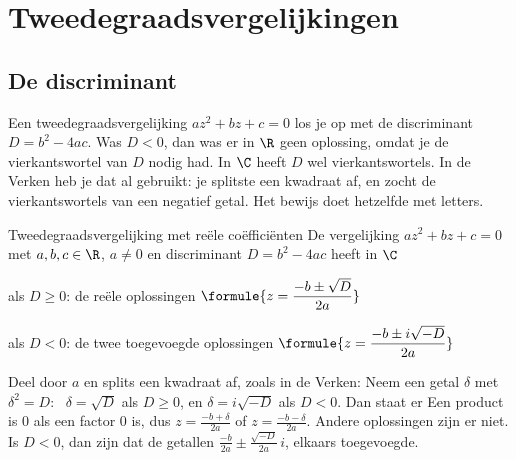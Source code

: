 \section{Tweedegraadsvergelijkingen}

\subsection{De discriminant}

Een tweedegraadsvergelijking $az^2 + bz + c = 0$ los je op met de discriminant $D = b^2 - 4ac$. Was $D < 0$, dan was er in $\R$ geen oplossing, omdat je de vierkantswortel van $D$ nodig had. In $\C$ heeft $D$ wel vierkantswortels. In de Verken heb je dat al gebruikt: je splitste een kwadraat af, en zocht de vierkantswortels van een negatief getal. Het bewijs doet hetzelfde met letters.

\begin{theorie}
\begin{stelling}{Tweedegraadsvergelijking met reële coëfficiënten}
De vergelijking $az^2 + bz + c = 0$ met $a, b, c \in \R$, $a \neq 0$ en discriminant $D = b^2 - 4ac$ heeft in $\C$

\vspace{1mm}
als $D \geqslant 0$: de reële oplossingen \quad $\formule{z = \dfrac{-b \pm \sqrt{D}}{2a}}$

\vspace{1mm}
als $D < 0$: de twee toegevoegde oplossingen \quad $\formule{z = \dfrac{-b \pm i\sqrt{-D}}{2a}}$
\end{stelling}

\begin{bewijs}
Deel door $a$ en splits een kwadraat af, zoals in de Verken:
Neem een getal $\delta$ met $\delta^2 = D$: \ $\delta = \sqrt{D}$ als $D \geqslant 0$, en $\delta = i\sqrt{-D}$ als $D < 0$. Dan staat er
Een product is 0 als een factor 0 is, dus $z = \frac{-b + \delta}{2a}$ of $z = \frac{-b - \delta}{2a}$. Andere oplossingen zijn er niet. Is $D < 0$, dan zijn dat de getallen $\frac{-b}{2a} \pm \frac{\sqrt{-D}}{2a}\,i$, elkaars toegevoegde.
\end{bewijs}
\end{theorie}

